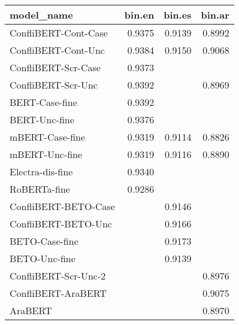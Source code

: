 \begin{table}[ht]
\centering
\begin{tabular}{lrrr}
  \hline
model\_name & bin.en & bin.es & bin.ar \\ 
  \hline
ConfliBERT-Cont-Case & 0.9375 & 0.9139 & 0.8992 \\ 
ConfliBERT-Cont-Unc & 0.9384 & 0.9150 & 0.9068 \\ 
ConfliBERT-Scr-Case & 0.9373 &  &  \\ 
ConfliBERT-Scr-Unc & 0.9392 &  & 0.8969 \\ 
BERT-Case-fine & 0.9392 &  &  \\ 
BERT-Unc-fine & 0.9376 &  &  \\ 
mBERT-Case-fine & 0.9319 & 0.9114 & 0.8826 \\ 
mBERT-Unc-fine & 0.9319 & 0.9116 & 0.8890 \\ 
Electra-dis-fine & 0.9340 &  &  \\ 
RoBERTa-fine & 0.9286 &  &  \\ 
ConfliBERT-BETO-Case &  & 0.9146 &  \\ 
ConfliBERT-BETO-Unc &  & 0.9166 &  \\ 
BETO-Case-fine &  & 0.9173 &  \\ 
BETO-Unc-fine &  & 0.9139 &  \\ 
ConfliBERT-Scr-Unc-2 &  &  & 0.8976 \\ 
ConfliBERT-AraBERT &  &  & 0.9075 \\ 
AraBERT &  &  & 0.8970 \\ 
   \hline
\end{tabular}
\end{table}
